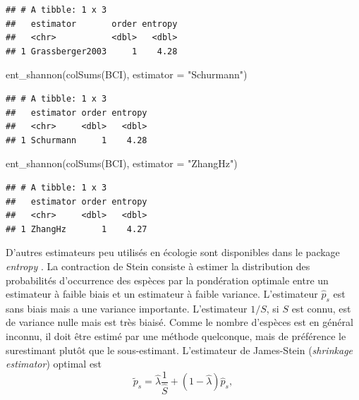 \documentclass[
  11pt,
  american,
  a4paper,
  extrafontsizes,onecolumn,openright
  ]{memoir}
\newenvironment{Shaded}{\begin{snugshade}}{\end{snugshade}}
\newcommand{\AttributeTok}[1]{\textcolor[rgb]{0.77,0.63,0.00}{#1}}
\newcommand{\FunctionTok}[1]{\textcolor[rgb]{0.00,0.00,0.00}{#1}}
\newcommand{\NormalTok}[1]{#1}
\newcommand{\StringTok}[1]{\textcolor[rgb]{0.31,0.60,0.02}{#1}}
\begin{document}
\begin{verbatim}
## # A tibble: 1 x 3
##   estimator       order entropy
##   <chr>           <dbl>   <dbl>
## 1 Grassberger2003     1    4.28
\end{verbatim}

\begin{Shaded}
\begin{Highlighting}[]
\FunctionTok{ent\_shannon}\NormalTok{(}\FunctionTok{colSums}\NormalTok{(BCI), }\AttributeTok{estimator =} \StringTok{"Schurmann"}\NormalTok{)}
\end{Highlighting}
\end{Shaded}

\begin{verbatim}
## # A tibble: 1 x 3
##   estimator order entropy
##   <chr>     <dbl>   <dbl>
## 1 Schurmann     1    4.28
\end{verbatim}

\begin{Shaded}
\begin{Highlighting}[]
\FunctionTok{ent\_shannon}\NormalTok{(}\FunctionTok{colSums}\NormalTok{(BCI), }\AttributeTok{estimator =} \StringTok{"ZhangHz"}\NormalTok{)}
\end{Highlighting}
\end{Shaded}

\begin{verbatim}
## # A tibble: 1 x 3
##   estimator order entropy
##   <chr>     <dbl>   <dbl>
## 1 ZhangHz       1    4.27
\end{verbatim}

\normalsize

D'autres estimateurs peu utilisés en écologie sont disponibles dans le package \emph{entropy} \autocite{Hausser2009}.
La contraction de Stein \autocite{James1961} consiste à estimer la distribution des probabilités d'occurrence des espèces par la pondération optimale entre un estimateur à faible biais et un estimateur à faible variance.
L'estimateur \(\hat{p}_s\) est sans biais mais a une variance importante.
L'estimateur \(1/S\), si \(S\) est connu, est de variance nulle mais est très biaisé.
Comme le nombre d'espèces est en général inconnu, il doit être estimé par une méthode quelconque, mais de préférence le surestimant plutôt que le sous-estimant.
L'estimateur de James-Stein (\emph{shrinkage estimator}) optimal est
\begin{equation}
  \label{eq:JamesStein1}
  \tilde{p}_s = \hat{\lambda}\frac{1}{\hat{S}} + \left( 1 - \hat{\lambda} \right) \hat{p}_s,
\end{equation}
\end{document}
